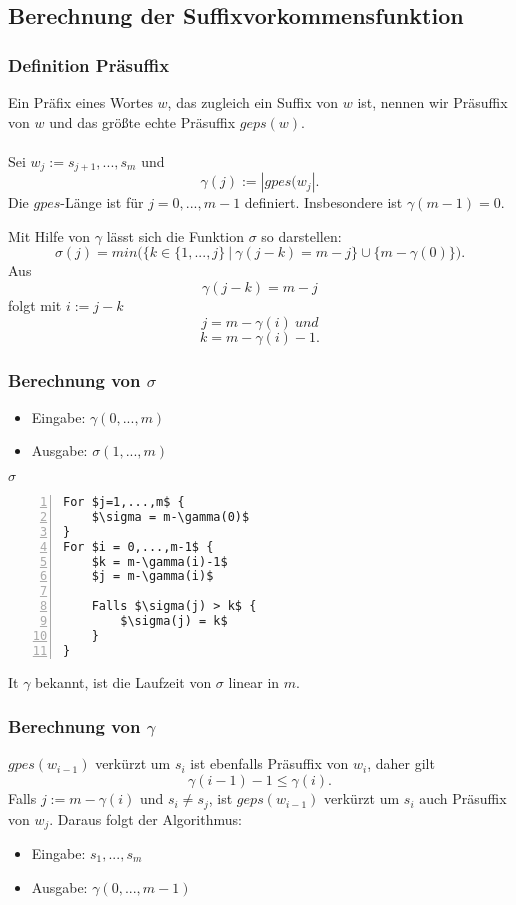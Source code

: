 \subsection{Berechnung der Suffixvorkommensfunktion}

\subsubsection{Definition Präsuffix}
Ein Präfix eines Wortes \(w\), das zugleich ein Suffix von \(w\) ist, nennen wir Präsuffix von \(w\) und das größte echte Präsuffix \(geps(w)\).
\\\\
Sei \(w_j := s_{j+1},...,s_m\) und
\[\gamma(j) := |gpes(w_j|.\]
Die \(gpes\)-Länge ist für \(j=0,...,m-1\) definiert. Insbesondere ist \(\gamma(m-1)=0\).

Mit Hilfe von \(\gamma\) lässt sich die Funktion \(\sigma\) so darstellen:
\[\sigma(j) = min\Big( \{k\in \{1,...,j\} ~|~\gamma(j-k) = m-j\} \cup \{m-\gamma(0)\}\Big).\]
Aus
\[\gamma(j-k) = m-j\]
folgt mit \(i := j-k\)
\[j = m-\gamma(i)~und\]
\[k = m-\gamma(i)-1.\]

\subsubsection{Berechnung von \(\sigma\)}
\begin{itemize}
	\item Eingabe: \(\gamma(0,...,m)\)
	\item Ausgabe: \(\sigma(1,...,m)\)
\end{itemize}

\begin{minipage}{\textwidth}
\(\sigma\)
\begin{lstlisting}[frame=single,numbers=left,mathescape]
For $j=1,...,m$ {
	$\sigma = m-\gamma(0)$
}
For $i = 0,...,m-1$ {
	$k = m-\gamma(i)-1$
	$j = m-\gamma(i)$

	Falls $\sigma(j) > k$ {
		$\sigma(j) = k$
	}
}
\end{lstlisting}
\end{minipage}
It \(\gamma\) bekannt, ist die Laufzeit von \(\sigma\) linear in \(m\).

\subsubsection{Berechnung von \(\gamma\)}
\(gpes(w_{i-1})\) verkürzt um \(s_i\) ist ebenfalls Präsuffix von \(w_i\), daher gilt
\[\gamma(i-1) -1 \leq \gamma(i).\]
Falls \(j := m-\gamma(i)\) und \(s_i \ne s_j\), ist \(geps(w_{i-1})\) verkürzt um \(s_i\) auch Präsuffix von \(w_j\). Daraus folgt der Algorithmus:
\begin{itemize}
	\item Eingabe: \(s_1,...,s_m\)
	\item Ausgabe: \(\gamma(0,...,m-1)\)
\end{itemize}

